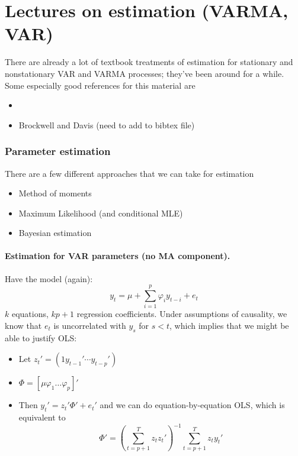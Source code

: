 % 

\part*{Lectures on estimation (VARMA, VAR)}

There are already a lot of textbook treatments of estimation for
stationary and nonstationary VAR and VARMA processes; they've been
around for a while.  Some especially good references for this material
are
\begin{itemize}
\item \citet{Ham_1994}
\item Brockwell and Davis (need to add to bibtex file)
\end{itemize}

\section{Parameter estimation}

There are a few different approaches that we can take for estimation
\begin{itemize}
\item Method of moments
\item Maximum Likelihood (and conditional MLE)
\item Bayesian estimation
\end{itemize}

\subsection{Estimation for VAR parameters (no MA component).}

Have the model (again):
\[y_t = μ + ∑_{i=1}^p φ_i y_{t-i} + e_t\] $k$ equations, $k p + 1$
regression coefficients. Under assumptions of causality, we know that
$e_t$ is uncorrelated with $y_s$ for $s < t$, which implies that we
might be able to justify OLS:
\begin{itemize}
\item Let $z_t' = (1 y_{t-1}' ⋯ y_{t-p}')$
\item $Φ = [ μ φ_1 … φ_p ]'$
\item Then $y_t' = z_t'Φ' + e_t'$ and we can do equation-by-equation
  OLS, which is equivalent to
  \[\hat Φ' = (∑_{t=p+1}^T z_t z_t')^{-1} ∑_{t=p+1}^T z_t y_t'\]
\end{itemize}

